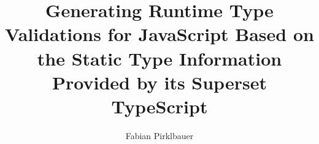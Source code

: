 \documentclass[master,english]{hgbthesis}
\title{Generating Runtime Type Validations for JavaScript Based on the Static Type Information Provided by its Superset TypeScript}
\author{Fabian Pirklbauer}
\begin{document}

\frontmatter

\maketitle
\tableofcontents


			

\mainmatter









\appendix 




\MakeBibliography



\end{document}
